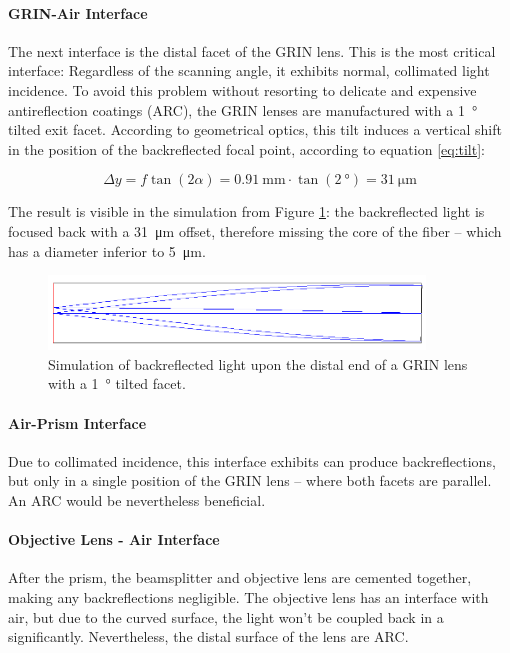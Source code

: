 \paragraph{GRIN-Air Interface} The next interface is the distal facet of the GRIN lens. This is the most critical interface: Regardless of the scanning angle, it exhibits normal, collimated light incidence. To avoid this problem without resorting to delicate and expensive antireflection coatings (ARC), the GRIN lenses are manufactured with a \SI{1}{\degree} tilted exit facet. According to geometrical optics, this tilt induces a vertical shift in the position of the backreflected focal point, according to equation \ref{eq:tilt}:

\begin{equation}
\Delta y = f \tan(2\alpha) = \SI{0.91}{\milli\meter} \cdot \tan (\SI{2}{\degree}) = \SI{31}{\micro\meter}
\label{eq:tilt}
\end{equation}

The result is visible in the simulation from Figure \ref{fig:tilt}: the backreflected light is focused back with a \SI{31}{\micro\meter} offset, therefore missing the core of the fiber -- which has a diameter inferior to \SI{5}{\micro\meter}.

\begin{figure}[h!]\centering
      \includegraphics[width=10cm]{figures/30_DesignSimulation/Optical/backreflection.png}
      \caption{Simulation of backreflected light upon the distal end of a GRIN lens with a \SI{1}{\degree} tilted facet.}
      \label{fig:tilt}
\end{figure}

\paragraph{Air-Prism Interface} Due to collimated incidence, this interface exhibits can produce backreflections, but only in a single position of the GRIN lens -- where both facets are parallel. An ARC would be nevertheless beneficial. 

\paragraph{Objective Lens - Air Interface} After the prism, the beamsplitter and objective lens are cemented together, making any backreflections negligible. The objective lens has an interface with air, but due to the curved surface, the light won't be coupled back in a significantly. Nevertheless, the distal surface of the lens are ARC.

